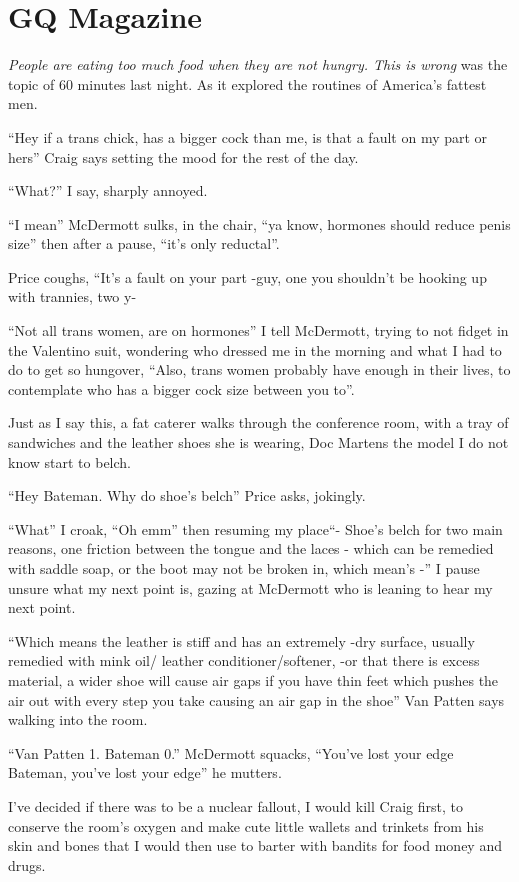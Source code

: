 \documentclass[19pt,openany]{book}
\begin{document}
\chapter{GQ Magazine}
\textit{People are eating too much
food when they are not hungry. This is wrong}
was the topic of 60 minutes last night. As
it explored the routines of America's fattest men.

``Hey if a trans chick, has a bigger
cock than me, is that a fault on my
part or hers'' Craig says setting
the mood for the rest of the day.

``What?'' I say, sharply annoyed.

``I mean'' McDermott sulks, in the chair,
``ya know, hormones should reduce penis size''
then after a pause, ``it's only reductal''.

Price coughs, ``It's a fault on your part -guy, one you
shouldn't be hooking up with trannies, two
y-

``Not all trans women, are on hormones'' I tell
McDermott, trying to not fidget in the
Valentino suit, wondering who dressed
me in the morning and what I had
to do to get so hungover, ``Also, trans
women probably have enough in their lives,
to contemplate who has a bigger cock size
between you to''.

Just as I say this, a fat caterer
walks through the conference room, with
a tray of sandwiches and the leather shoes
she is wearing, Doc Martens the model
I do not know start to belch.

``Hey Bateman. Why do shoe's belch'' Price
asks, jokingly.

``What'' I croak, ``Oh emm'' then
resuming my place``- Shoe's
belch for two main reasons, one friction
between the tongue and the laces -
which can be remedied with saddle soap,
or the boot may not be broken in, which mean's -'' I pause
unsure what my next point is, gazing
at McDermott who is leaning to hear my
next point.

``Which means the leather is stiff and has
an extremely -dry surface, usually
remedied with mink oil/ leather conditioner/softener,
-or that there is excess material, a wider shoe
will cause air gaps if you have thin feet which
pushes the air out with every step you take
causing an air gap in the shoe'' Van Patten
says walking into the room.

``Van Patten 1. Bateman 0.'' McDermott squacks, ``You've
lost your edge Bateman, you've lost your edge'' he
mutters.

I've decided if there was to be a nuclear fallout,
I would kill Craig first, to conserve
the room's oxygen
and make cute little wallets and
trinkets from his skin and bones that I would then
use to barter with bandits for food money and
drugs.
\end{document}
